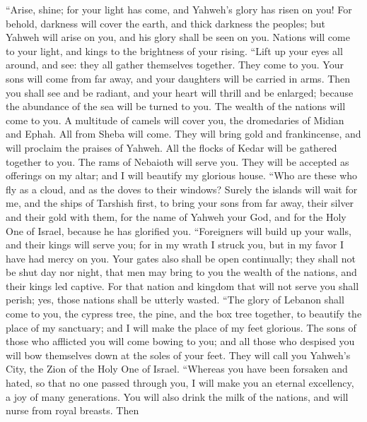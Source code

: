  ``Arise, shine; for your light has come, and Yahweh's
glory has risen on you!  For behold, darkness will cover
the earth, and thick darkness the peoples; but Yahweh will arise on you,
and his glory shall be seen on you.  Nations will come to
your light, and kings to the brightness of your rising. 
``Lift up your eyes all around, and see: they all gather themselves
together. They come to you. Your sons will come from far away, and your
daughters will be carried in arms.  Then you shall see and
be radiant, and your heart will thrill and be enlarged; because the
abundance of the sea will be turned to you. The wealth of the nations
will come to you.  A multitude of camels will cover you,
the dromedaries of Midian and Ephah. All from Sheba will come. They will
bring gold and frankincense, and will proclaim the praises of Yahweh.
 All the flocks of Kedar will be gathered together to you.
The rams of Nebaioth will serve you. They will be accepted as offerings
on my altar; and I will beautify my glorious house.  ``Who
are these who fly as a cloud, and as the doves to their windows?
 Surely the islands will wait for me, and the ships of
Tarshish first, to bring your sons from far away, their silver and their
gold with them, for the name of Yahweh your God, and for the Holy One of
Israel, because he has glorified you.  ``Foreigners will
build up your walls, and their kings will serve you; for in my wrath I
struck you, but in my favor I have had mercy on you. 
Your gates also shall be open continually; they shall not be shut day
nor night, that men may bring to you the wealth of the nations, and
their kings led captive.  For that nation and kingdom
that will not serve you shall perish; yes, those nations shall be
utterly wasted.  ``The glory of Lebanon shall come to
you, the cypress tree, the pine, and the box tree together, to beautify
the place of my sanctuary; and I will make the place of my feet
glorious.  The sons of those who afflicted you will come
bowing to you; and all those who despised you will bow themselves down
at the soles of your feet. They will call you Yahweh's City, the Zion of
the Holy One of Israel.  ``Whereas you have been forsaken
and hated, so that no one passed through you, I will make you an eternal
excellency, a joy of many generations.  You will also
drink the milk of the nations, and will nurse from royal breasts. Then
